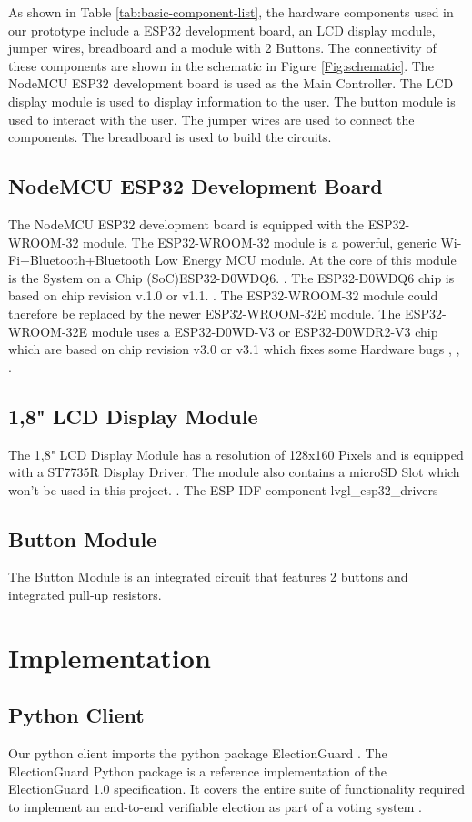 As shown in Table \ref{tab:basic-component-list}, the hardware components used in our prototype include a ESP32 development board, an LCD display module, jumper wires, breadboard and a module with 2 Buttons. The connectivity of these components are shown in the schematic in Figure \ref{Fig:schematic}. The NodeMCU ESP32 development board is used as the Main Controller. The LCD display module is used to display information to the user. The button module is used to interact with the user. The jumper wires are used to connect the components. The breadboard is used to build the circuits.

\subsection{NodeMCU ESP32 Development Board}
The NodeMCU ESP32 development board is equipped with the ESP32-WROOM-32 module. The ESP32-WROOM-32 module is a powerful, generic Wi-Fi+Bluetooth+Bluetooth Low Energy MCU module. At the core of this module is the System on a Chip (SoC)ESP32-D0WDQ6. \cite[6]{esp32-module}. The ESP32-D0WDQ6 chip is based on chip revision v.1.0 or v1.1. \cite[11]{esp32-ds}. The ESP32-WROOM-32 module could therefore be replaced by the newer ESP32-WROOM-32E module. The ESP32-WROOM-32E module uses a ESP32-D0WD-V3 or ESP32-D0WDR2-V3 chip which are based on chip revision v3.0 or v3.1 which fixes some Hardware bugs \cite[1]{esp32-module-new}, \cite[11]{esp32-ds}, \cite[3-4]{esp32-errata}. 

\subsection{1,8" LCD Display Module}
The 1,8" LCD Display Module has a resolution of 128x160 Pixels and is equipped with a ST7735R Display Driver.  The module also contains a microSD Slot which won't be used in this project. \cite[2]{lcd}.
The ESP-IDF component lvgl_esp32_drivers


\subsection{Button Module}
The Button Module is an integrated circuit that features 2 buttons and integrated pull-up resistors. \cite[1]{button-ds}


\section{Implementation}
\subsection{Python Client}
Our python client imports the python package ElectionGuard \cite{python-reference}. The ElectionGuard Python package is a reference implementation of the ElectionGuard 1.0 specification. It covers the entire suite of functionality required to implement an end-to-end verifiable election as part of a voting system \cite{eg-docs}. 



